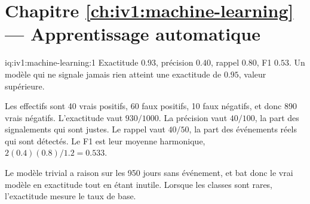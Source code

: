 \section*{Chapitre \ref{ch:iv1:machine-learning} --- Apprentissage automatique}

\begin{solution}{iq:iv1:machine-learning:1}
Exactitude $0.93$, précision $0.40$, rappel $0.80$, F1 $0.53$. Un modèle qui ne signale jamais rien atteint une exactitude de $0.95$, valeur supérieure.

Les effectifs sont 40 vrais positifs, 60 faux positifs, 10 faux négatifs, et donc 890 vrais négatifs. L'exactitude vaut $930/1000$. La précision vaut $40/100$, la part des signalements qui sont justes. Le rappel vaut $40/50$, la part des événements réels qui sont détectés. Le F1 est leur moyenne harmonique, $2(0.4)(0.8)/1.2 = 0.533$.

Le modèle trivial a raison sur les 950 jours sans événement, et bat donc le vrai modèle en exactitude tout en étant inutile. Lorsque les classes sont rares, l'exactitude mesure le taux de base.



\end{solution}

